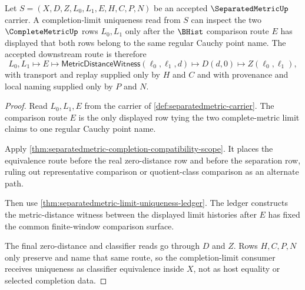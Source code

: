 \begin{theorem}\label{thm:separatedmetric-limit-route-scope}
Let $S=(X,D,Z,L_0,L_1,E,H,C,P,N)$ be an accepted $\SeparatedMetricUp$ carrier. A completion-limit uniqueness read from $S$ can inspect the two $\CompleteMetricUp$ rows $L_0,L_1$ only after the $\BHist$ comparison route $E$ has displayed that both rows belong to the same regular Cauchy point name. The accepted downstream route is therefore
$$
L_0,L_1 \longmapsto E \longmapsto \mathsf{MetricDistanceWitness}(\ell_0,\ell_1,d) \longmapsto D(d,0) \longmapsto Z(\ell_0,\ell_1),
$$
with transport and replay supplied only by $H$ and $C$ and with provenance and local naming supplied only by $P$ and $N$.
\end{theorem}
\begin{proof}
Read $L_0,L_1,E$ from the carrier of \autoref{def:separatedmetric-carrier}. The comparison route $E$ is the only displayed row tying the two complete-metric limit claims to one regular Cauchy point name.

Apply \autoref{thm:separatedmetric-completion-compatibility-scope}. It places the equivalence route before the real zero-distance row and before the separation row, ruling out representative comparison or quotient-class comparison as an alternate path.

Then use \autoref{thm:separatedmetric-limit-uniqueness-ledger}. The ledger constructs the metric-distance witness between the displayed limit histories after $E$ has fixed the common finite-window comparison surface.

The final zero-distance and classifier reads go through $D$ and $Z$. Rows $H,C,P,N$ only preserve and name that same route, so the completion-limit consumer receives uniqueness as classifier equivalence inside $X$, not as host equality or selected completion data.
\end{proof}

